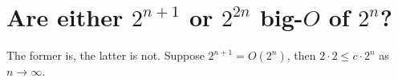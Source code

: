 \section[Problem 4]{Are either $2^{n + 1}$ or $2^{2n}$ big-$O$ of $2^n$?}

The former is, the latter is not. Suppose $2^{n + 1} = O(2^n)$, then $2 \cdot 2 \leq c \cdot 2^n$ as $n \rightarrow \infty$.
